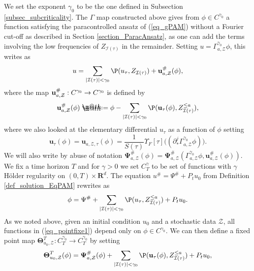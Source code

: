 \documentclass[11pt]{preprint}
\makeatletter
\newcommand{\mcI}{\mathcal{I}}
\newcommand{\mcZ}{\mathcal{Z}}
\def\eqref#1{(\ref{#1})}
\newcommand*{\defeq}{\mathrel{\rlap{%
			\raisebox{0.3ex}{$\m@th\cdot$}}%
		\raisebox{-0.3ex}{$\m@th\cdot$}}%
	=}
\newcommand{\bfR}{\mathbf{R}}
\makeatother
\begin{document}
		
		We set the exponent $\gamma_0$ to be the one defined in Subsection \ref{subsec_subcriticality}. The $\Gamma$ map constructed above gives from $\phi\in C^{\gamma_0}$ a function satisfying the paracontrolled ansatz of \eqref{eq_gPAM} without a Fourier cut-off as described in Section \ref{section_ParacAnsatz}, as one can add the terms involving the low frequencies of $Z_{\mcI(\tau)}$ in the remainder. Setting $u=\Gamma^{\gamma_0}_{a,\mcZ}\phi$, this writes as
		\begin{equation}\label{eq_AnsatzWithUdashPhi}
			u=\sum_{|\mcI(\tau)|<\gamma_0}\P(u_\tau, Z_{\mcI(\tau)} ) + {\bold u}_{a,\mcZ}^\# (\phi),
		\end{equation}
		where the map ${\bold u}_{a,\mcZ}^\# : C^{\gamma_0} \to C^{\gamma_0}$ is defined by 
		\begin{equation}\label{eq_defUdashPhi}
			{\bold u}_{a,\mcZ}^\# (\phi) \defeq \phi - \sum_{|\mcI(\tau)|<\gamma_0} \P( {\mathbf u}_\tau(\phi) , Z_{\mcI(\tau)}^{\leq a} ),
		\end{equation}
		where we also looked at the elementary differential $u_\tau$ as a function of $\phi$ setting
			$$
		{\mathbf u}_\tau(\phi) = 	{\mathbf u}_{a,\mcZ,\tau}(\phi) = \frac{1}{S(\tau)}\Upsilon_F[\tau]\big( (\partial^j_* \Gamma^{\gamma_0}_{a,\mcZ} \phi)\big).
		$$
		We will also write by abuse of notation
		$
		{\boldsymbol{\Psi}}^\#_{a,\mcZ}(\phi) = 	{\boldsymbol{\Psi}}_{a,\mcZ}^\#( \Gamma^{\gamma_0}_{a,\mcZ} \phi , {\mathbf u }_{a,\mcZ}^\#(\phi)) .
		$																																				
		We fix a time horizon $T$ and for $\gamma>0$ we set $C^\gamma_T$ to be set of functions with $\gamma$ Hölder regularity on $(0,T)\times\bfR^d$. The equation $u^\# = \Psi^\# + P_tu_0$ from Definition \ref{def_solution_EqPAM} rewrites as 
		\begin{equation}\label{eq_pointfixe1}
			\phi = \Psi^\# +  \sum_{|\mcI(\tau)|<\gamma_0} \P(u_\tau,Z_{\mcI(\tau)}^{\leq a})  + P_t u_0.
		\end{equation}
		As we noted above, given an initial condition $u_0$ and a stochastic data  $\mcZ$, all functions in \eqref{eq_pointfixe1} depend only on $\phi\in C^{\gamma_0}$. We can then define a fixed point map $\boldsymbol{\Theta}_{u_0,\mcZ}^T : C^{\gamma_0}_T \to C^{\gamma_0}_T $ by setting 
		\begin{equation}\label{eq_DefAppTheta}
		\boldsymbol{\Theta}_{u_0,\mcZ}^T (\phi) =  \boldsymbol{\Psi}_{a,\mcZ}^\#(\phi) + \sum_{|\mcI(\tau)|<\gamma_0} \P({\mathbf u}_\tau(\phi) ,Z_{\mcI(\tau)}^{\leq a})  + P_t u_0,
	\end{equation}
		
\end{document}
